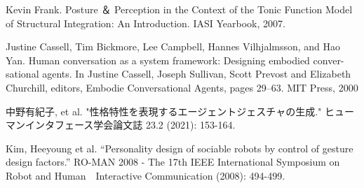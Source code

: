 \begin{thebibliography}{27}
Kevin Frank. Posture ＆ Perception in the Context of the Tonic Function Model of Structural Integration: An Introduction. IASI Yearbook, 2007.

Justine Cassell, Tim Bickmore, Lee Campbell, Hannes Vilhjalmsson, and Hao Yan. Human conversation as a system framework: Designing embodied conver- sational agents. In Justine Cassell, Joseph Sullivan, Scott Prevost and Elizabeth Churchill, editors, Embodie Conversational Agents, pages 29–63. MIT Press, 2000



中野有紀子, et al. "性格特性を表現するエージェントジェスチャの生成." ヒューマンインタフェース学会論文誌 23.2 (2021): 153-164.




Kim, Heeyoung et al. “Personality design of sociable robots by control of gesture design factors.” RO-MAN 2008 - The 17th IEEE International Symposium on Robot and Human　Interactive Communication (2008): 494-499.



















\end{thebibliography}